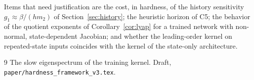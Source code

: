 \documentclass[11pt]{article}
\theoremstyle{definition}
\theoremstyle{remark}
\begin{document}
Items that need justification are the cost, in hardness, of the history sensitivity $g_1 \approx \beta/(hm_2)$ of Section~\ref{sec:history}; the heuristic horizon of C5; the behavior of the quotient exponents of Corollary~\ref{cor:lyap} for a trained network with non-normal, state-dependent Jacobian; and whether the leading-order kernel on repeated-state inputs coincides with the kernel of the state-only architecture.

\begin{thebibliography}{9}
The slow eigenspectrum of the training kernel. Draft, \texttt{paper/hardness\_framework\_v3.tex}.
\end{thebibliography}
\end{document}

